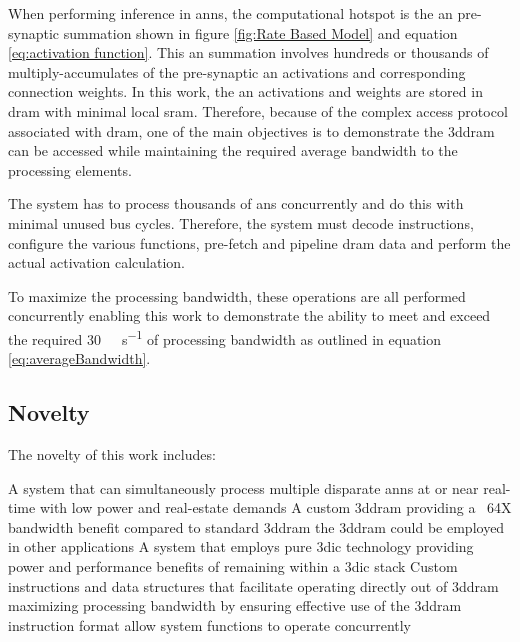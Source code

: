 When performing inference in \acp{ann}, the computational hotspot is the \ac{an} pre-synaptic summation shown in figure \ref{fig:Rate Based Model} and equation \eqref{eq:activation function}.
This \ac{an} summation involves hundreds or thousands of multiply-accumulates of the pre-synaptic \ac{an} activations and corresponding connection weights. 
In this work, the \ac{an} activations and weights are stored in \ac{dram} with minimal local \ac{sram}. 
Therefore, because of the complex access protocol associated with \ac{dram}, one of the main objectives is to demonstrate the \ac{3ddram} can be accessed while maintaining the required average bandwidth to the processing elements.
\iffalse with relatively high levels of bus efficiency. \fi

The system has to process thousands of \acp{an} concurrently and do this with minimal unused bus cycles.
Therefore, the system must decode instructions, configure the various functions, pre-fetch and pipeline \ac{dram} data and perform the actual activation calculation. 

To maximize the processing bandwidth, these operations are all performed concurrently enabling this work to demonstrate the ability to meet and exceed the required \SI[per-mode=symbol]{30}{\tera \bit \per \second} of processing bandwidth as outlined in equation \eqref{eq:averageBandwidth}.

\iffalse
The problem associated with processing \acp{ann} are outlined in section \ref{sec:The Problem}. 
\fi

\subsection[Novelty]{Novelty}
\label{sec:Novelty}

The novelty of this work includes:
\begin{outline}
    \1 A system that can simultaneously process multiple disparate \ac{ann}s at or near real-time 
      \2 with low power and real-estate demands
    \1 A custom \ac{3ddram} providing a ~64X bandwidth benefit compared to standard \ac{3ddram}
      \2 the \ac{3ddram} could be employed in other applications
    \1 A system that employs pure \ac{3dic} technology
      \2 providing power and performance benefits of remaining within a \ac{3dic} stack
    \1 Custom instructions and data structures that facilitate operating directly out of \ac{3ddram} 
      \2 maximizing processing bandwidth by ensuring effective use of the \ac{3ddram}
      \2 instruction format allow system functions to operate concurrently 
\end{outline}


